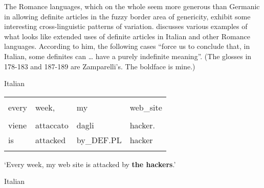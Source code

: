 \begin{styleBodytextC}
The Romance languages, which on the whole seem more generous than Germanic in allowing definite articles in the fuzzy border area of genericity, exhibit some interesting cross-linguistic patterns of variation. \citet{Zamparelli2002} discusses various examples of what looks like extended uses of definite articles in Italian and other Romance languages. According to him, the following cases “force us to conclude that, in Italian, some definites can … have a purely indefinite meaning”. (The glosses in 178{}-183 and 187{}-189 are Zamparelli’s. The boldface is mine.)

\end{styleBodytextC}

\begin{listWWNumileveli}
\item 

\begin{styleExample}
\label{bkm:Ref69030048}\label{bkm:Ref172696600}Italian

\end{styleExample}

\end{listWWNumileveli}

\begin{tabular}{llll}
\lsptoprule
\multicolumn{4}{l}{Ogni

}\\
every & week, & my & web\_site\\
&  &  & \\
viene & attaccato & dagli & hacker.\\
is & attacked & by\_DEF.PL & hacker\\
\lspbottomrule
\end{tabular}

\begin{styleTranslation}
‘Every week, my web site is attacked by \textbf{the hackers}.’

\end{styleTranslation}

\begin{listWWNumileveli}
\item 

\begin{styleExample}
\label{bkm:Ref69030716}Italian

\end{styleExample}

\end{listWWNumileveli}

